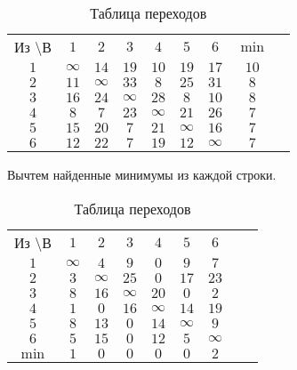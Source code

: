 \begin{table}[H]
\begin{center}
	\def\tabcolsep{15pt}
	\caption{Таблица переходов}
	\label{tab:2}
	\begin{tabular}{|c||c|c|c|c|c|c|c|c|}
		\hline
		Из \textbackslash В & $1$ & $2$ & $3$ & $4$ & $5$ & $6$ & $\min$ \\
		\hhline{|=#=|=|=|=|=|=#=|}
		$1$ & $\infty$ & $14$ & $19$ & $10$ & $19$ & $17$ & $10$ \\
		\hline
		$2$ & $11$ & $\infty$ & $33$ & $8$ & $25$ & $31$ & $8$ \\
		\hline
		$3$ & $16$ & $24$ & $\infty$ & $28$ & $8$ & $10$ & $8$ \\ 
		\hline
		$4$ & $8$ & $7$ & $23$ & $\infty$ & $21$ & $26$ & $7$ \\
		\hline
		$5$ & $15$ & $20$ & $7$ & $21$ & $\infty$ & $16$ & $7$ \\
		\hline
		$6$ & $12$ & $22$ & $7$ & $19$ & $12$ & $\infty$ & $7$ \\ 
		\hline
	\end{tabular}
\end{center}
\end{table} 

Вычтем найденные минимумы из каждой строки.

\begin{table}[H]
\begin{center}
	\def\tabcolsep{15pt}
	\caption{Таблица переходов}
	\label{tab:3}
	\begin{tabular}{|c||c|c|c|c|c|c|c|c|}
		\hline
		Из \textbackslash В & $1$ & $2$ & $3$ & $4$ & $5$ & $6$ \\
		\hhline{|=#=|=|=|=|=|=|}
		$1$ & $\infty$ & $4$ & $9$ & $0$ & $9$ & $7$ \\
		\hline
		$2$ & $3$ & $\infty$ & $25$ & $0$ & $17$ & $23$ \\
		\hline
		$3$ & $8$ & $16$ & $\infty$ & $20$ & $0$ & $2$ \\ 
		\hline
		$4$ & $1$ & $0$ & $16$ & $\infty$ & $14$ & $19$ \\
		\hline
		$5$ & $8$ & $13$ & $0$ & $14$ & $\infty$ & $9$ \\
		\hline
		$6$ & $5$ & $15$ & $0$ & $12$ & $5$ & $\infty$ \\ 
		\hhline{|=#=|=|=|=|=|=|}
		$\min$ & $1$ & $0$ & $0$ & $0$ & $0$ & $2$ \\ 
		\hline
	\end{tabular}
\end{center}
\end{table}

